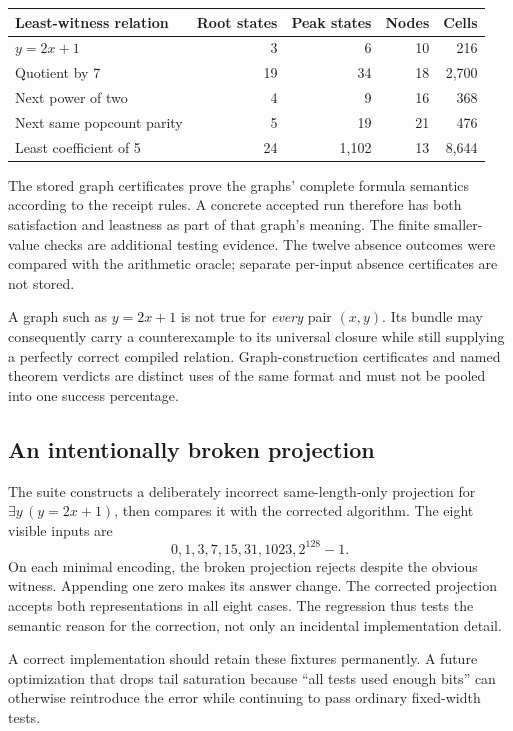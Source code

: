 \begin{center}
\begin{tabular}{@{}lrrrr@{}}
\toprule
Least-witness relation & Root states & Peak states & Nodes & Cells\\
\midrule
\(y=2x+1\) & 3 & 6 & 10 & 216\\
Quotient by 7 & 19 & 34 & 18 & 2,700\\
Next power of two & 4 & 9 & 16 & 368\\
Next same popcount parity & 5 & 19 & 21 & 476\\
Least coefficient of 5 & 24 & 1,102 & 13 & 8,644\\
\bottomrule
\end{tabular}
\end{center}

The stored graph certificates prove the graphs' complete formula semantics according to the receipt rules. A concrete accepted run therefore has both satisfaction and leastness as part of that graph's meaning. The finite smaller-value checks are additional testing evidence. The twelve absence outcomes were compared with the arithmetic oracle; separate per-input absence certificates are not stored.

A graph such as \(y=2x+1\) is not true for \emph{every} pair \((x,y)\). Its bundle may consequently carry a counterexample to its universal closure while still supplying a perfectly correct compiled relation. Graph-construction certificates and named theorem verdicts are distinct uses of the same format and must not be pooled into one success percentage.

\subsection{An intentionally broken projection}
The suite constructs a deliberately incorrect same-length-only projection for \(\exists y\,(y=2x+1)\), then compares it with the corrected algorithm. The eight visible inputs are
\[
 0,1,3,7,15,31,1023,2^{128}-1.
\]
On each minimal encoding, the broken projection rejects despite the obvious witness. Appending one zero makes its answer change. The corrected projection accepts both representations in all eight cases. The regression thus tests the semantic reason for the correction, not only an incidental implementation detail.

A correct implementation should retain these fixtures permanently. A future optimization that drops tail saturation because ``all tests used enough bits'' can otherwise reintroduce the error while continuing to pass ordinary fixed-width tests.

